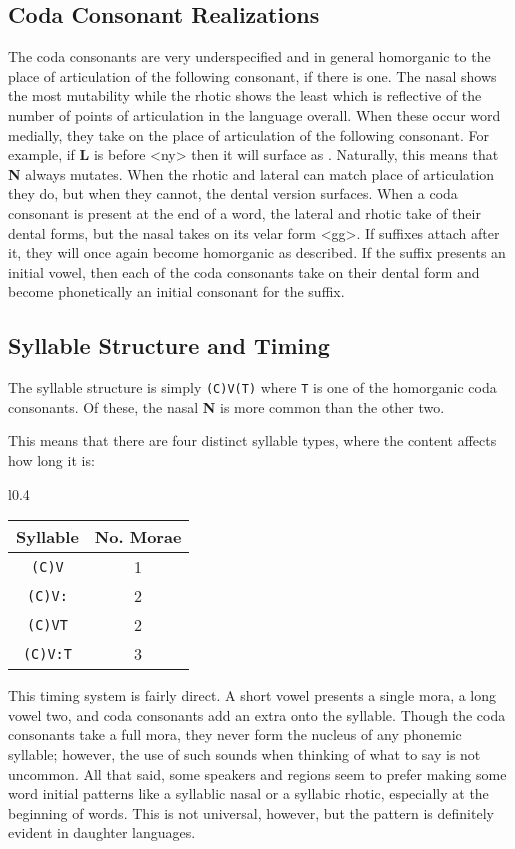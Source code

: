   \subsection{Coda Consonant Realizations}
  The coda consonants are very underspecified and in general homorganic to the place of articulation of the following consonant, if there is one. The nasal shows the most mutability while the rhotic shows the least which is reflective of the number of points of articulation in the language overall.
  When these occur word medially, they take on the place of articulation of the following consonant. For example, if \textbf{L} is before <ny> then it will surface as \phonemic{\palatall}. Naturally, this means that \textbf{N} always mutates. When the rhotic and lateral can match place of articulation they do, but when they cannot, the dental version surfaces.
  When a coda consonant is present at the end of a word, the lateral and rhotic take of their dental forms, but the nasal takes on its velar form <gg>. If suffixes attach after it, they will once again become homorganic as described. If the suffix presents an initial vowel, then each of the coda consonants take on their dental form and become phonetically an initial consonant for the suffix.

  \subsection{Syllable Structure and Timing}
  The syllable structure is simply \texttt{(C)V(T)} where \texttt{T} is one of the homorganic coda consonants. Of these, the nasal \textbf{N} is more common than the other two.\par
  This means that there are four distinct syllable types, where the content affects how long it is:\par
  \vertspace
  \begin{wrapfigure}{l}{0.4\textwidth}
    \begin{tabular}{|c|c|}
      \hline
      Syllable        & No. Morae \\ \hline \hline
      \texttt{(C)V}   & 1         \\
      \texttt{(C)V:}  & 2         \\
      \texttt{(C)VT}  & 2         \\ 
      \texttt{(C)V:T} & 3         \\ \hline
    \end{tabular}
  \end{wrapfigure} 
  This timing system is fairly direct. A short vowel presents a single mora, a long vowel two, and coda consonants add an extra onto the syllable. Though the coda consonants take a full mora, they never form the nucleus of any phonemic syllable; however, the use of such sounds when thinking of what to say is not uncommon. All that said, some speakers and regions seem to prefer making some word initial patterns like  a syllablic nasal or  a syllabic rhotic, especially at the beginning of words. This is not universal, however, but the pattern is definitely evident in daughter languages.\par

